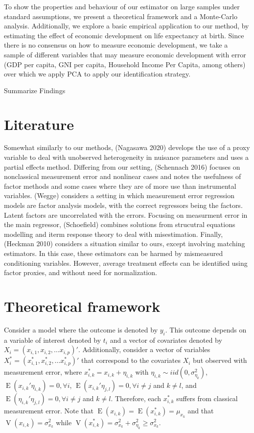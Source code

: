 \documentclass[12pt]{article}
\begin{document}
        To show the properties and behaviour of our estimator on large samples under standard assumptions, we present a theoretical framework and a Monte-Carlo analysis. Additionally, we explore a basic empirical application to our method, by estimating the effect of economic development on life expectancy at birth. Since there is no consensus on how to measure economic development, we take a sample of different variables that may measure economic development with error (GDP per capita, GNI per capita, Household Income Per Capita, among others) over which we apply PCA to apply our identification strategy.

        Summarize Findings

    \section*{Literature}

        Somewhat similarly to our methods, (Nagasawa 2020) develops the use of a proxy variable to deal with unobserved heterogeneity in nuisance parameters and uses a partial effects method. Differing from our setting, (Schennach 2016) focuses on nonclassical measurement error and nonlinear cases and notes the usefulness of factor methods and some cases where they are of more use than instrumental variables. (Wegge) considers a setting in which measurement error regression models are factor analysis models, with the correct regressors being the factors. Latent factors are uncorrelated with the errors. Focusing on measurment error in the main regressor, (Schoefield) combines solutions from strucutral equations modelling and iterm response theory to deal with misestimation. Finally, (Heckman 2010) considers a situation similar to ours, except involving matching estimators. In this case, these estimators can be harmed by mismeasured conditioning variables. However, average treatment effects can be identified using factor proxies, and without need for normalization.

    \section*{Theoretical framework}

        Consider a model where the outcome is denoted by $y_i$. This outcome depends on a variable of interest denoted by $t_i$ and a vector of covariates denoted by $X_i=(x_{i,1},x_{i,2},\dots x_{i,p})'$. Additionally, consider a vector of variables $X^*_i=(x^*_{i,1},x^*_{i,2},\dots x^*_{i,p})'$ that correspond to the covariates $X_i$ but observed with measurement error, where $x^*_{i,k}=x_{i,k}+\eta_{i,k}$ with $\eta_{i,k} \sim {iid}(0,\sigma^2_{\eta_k})$, $\operatorname{E}(x_{i,k}'\eta_{i,k})=0, \forall i$, $\operatorname{E}(x_{i,k}'\eta_{j,l})=0, \forall i\neq j$ and $k \neq l$, and $\operatorname{E}(\eta_{i,k}'\eta_{j,l})=0, \forall i\neq j$ and $k \neq l$. Therefore, each $x^*_{i,k}$ suffers from classical measurement error. Note that $\operatorname{E}(x_{i,k})=\operatorname{E}(x^*_{i,k})=\mu_{x_k}$ and that $\operatorname{V}(x_{i,k})=\sigma^2_{x_k}$ while $\operatorname{V}(x^*_{i,k})=\sigma^2_{x_k}+\sigma^2_{\eta_k}\geq \sigma^2_{x_k}$.
\end{document}
